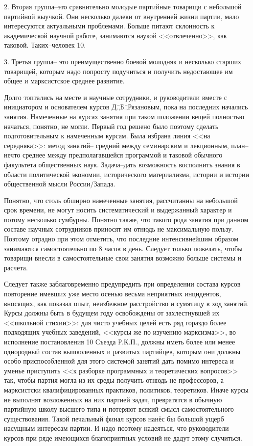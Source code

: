 2. Вторая группа\---это сравнительно молодые партийные товарищи с небольшой партийной выучкой. Они несколько далеки от внутренней жизни партии, мало интересуются актуальными проблемами. Больше питают склонность к академической научной работе, занимаются наукой <<отвлеченно>>, как таковой. Таких\---человек 10.

3. Третья группа\--- это преимущественно боевой молодняк и несколько старших товарищей, которым надо попросту подучиться и получить недостающее им общее и марксистское среднее развитие.

Долго топтались на месте и научные сотрудники, и руководители вместе с инициатором и основателем курсов Д.\=,Б.\=,Рязановым, пока на последних начались занятия. Намеченные на курсах занятия при таком положении вещей полностью начаться, понятно, не могли. Первый год решено было поэтому сделать подготовительным к намеченным курсам. Была избрана линия <<на середняка>>: метод занятий\--- средний между семинарским и лекционным, план\---нечто среднее между предполагавшейся программой и таковой обычного факультета общественных наук. Задача\---дать возможность восполнить знания в области политической экономии, исторического материализма, истории и истории общественной мысли России\-/Запада.

Понятно, что столь обширно намеченные занятия, рассчитанны на небольшой срок времени, не могут носить систематический и выдержанный характер и потому несколько сумбурны. Понятно также, что такого рода занятия при данном составе научных сотрудников приносят им отнюдь не максимальную пользу. Поэтому отрадно при этом отметить, что последние интенсивнейшим образом занимаются самостоятельно по 8 часов в день. Следует только пожелать, чтобы товарищи внесли в самостоятельные свои занятия возможно больше системы и расчета.

Следует также заблаговременно предупредить при определении состава курсов повторение имевших уже место осенью весьма неприятных инцидентов, вносящих, как показал опыт, неизбежное расстройство и сумятицу в ход занятий. Курсы должны быть в будущем году освобождены от захлестнувшей их <<школьной стихии>>: для чисто учебных целей есть ряд гораздо более подходящих учебных заведений, <<курсы же по изучению марксизма>>, во исполнение постановления 10 Съезда Р.К.П., должны иметь более или менее однородный состав вышколенных и развитых партийцев, которым они должны особо приспособленной для этого системой занятий дать помимо интереса и уменье приступить <<к разборке программных и теоретических вопросов>> так, чтобы партия могла из их среды получить отнюдь не профессоров, а марксистски квалифицированных практиков, политиков, теоретиков. Иначе курсы не выполнят возложенных на них партией задач, превратятся в обычную партийную школу высшего типа и потеряют всякий смысл самостоятельного существования. Такой печальный финал курсов нанёс бы большой ущерб насущным интересам партии. И надо поэтому надеяться, что руководители курсов при ряде имеющихся благоприятных условий не дадут этому случиться.

